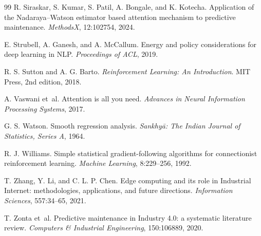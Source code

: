 \documentclass[11pt]{article}
\begin{document}
\begin{thebibliography}{99}
R. Siraskar, S. Kumar, S. Patil, A. Bongale, and K. Kotecha.
Application of the Nadaraya--Watson estimator based attention mechanism to predictive maintenance.
\emph{MethodsX}, 12:102754, 2024.

E. Strubell, A. Ganesh, and A. McCallum.
Energy and policy considerations for deep learning in NLP.
\emph{Proceedings of ACL}, 2019.

R. S. Sutton and A. G. Barto.
\emph{Reinforcement Learning: An Introduction}.
MIT Press, 2nd edition, 2018.

A. Vaswani et~al.
Attention is all you need.
\emph{Advances in Neural Information Processing Systems}, 2017.

G. S. Watson.
Smooth regression analysis.
\emph{Sankhy\={a}: The Indian Journal of Statistics, Series A}, 1964.

R. J. Williams.
Simple statistical gradient-following algorithms for connectionist reinforcement learning.
\emph{Machine Learning}, 8:229--256, 1992.

T. Zhang, Y. Li, and C. L. P. Chen.
Edge computing and its role in Industrial Internet: methodologies, applications, and future directions.
\emph{Information Sciences}, 557:34--65, 2021.

T. Zonta et~al.
Predictive maintenance in Industry 4.0: a systematic literature review.
\emph{Computers \& Industrial Engineering}, 150:106889, 2020.

\end{thebibliography}
\end{document}
